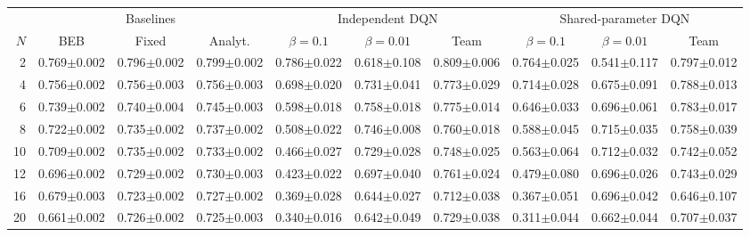 \begin{tabular}{@{}r|ccc|ccc|ccc@{}}
\toprule
 & \multicolumn{3}{c|}{Baselines} & \multicolumn{3}{c|}{Independent DQN} & \multicolumn{3}{c}{Shared-parameter DQN} \\
$N$ & BEB & Fixed & Analyt. & $\beta{=}0.1$ & $\beta{=}0.01$ & Team & $\beta{=}0.1$ & $\beta{=}0.01$ & Team \\
\midrule
2 & 0.769$\pm$0.002 & 0.796$\pm$0.002 & 0.799$\pm$0.002 & 0.786$\pm$0.022 & 0.618$\pm$0.108 & 0.809$\pm$0.006 & 0.764$\pm$0.025 & 0.541$\pm$0.117 & 0.797$\pm$0.012 \\
4 & 0.756$\pm$0.002 & 0.756$\pm$0.003 & 0.756$\pm$0.003 & 0.698$\pm$0.020 & 0.731$\pm$0.041 & 0.773$\pm$0.029 & 0.714$\pm$0.028 & 0.675$\pm$0.091 & 0.788$\pm$0.013 \\
6 & 0.739$\pm$0.002 & 0.740$\pm$0.004 & 0.745$\pm$0.003 & 0.598$\pm$0.018 & 0.758$\pm$0.018 & 0.775$\pm$0.014 & 0.646$\pm$0.033 & 0.696$\pm$0.061 & 0.783$\pm$0.017 \\
8 & 0.722$\pm$0.002 & 0.735$\pm$0.002 & 0.737$\pm$0.002 & 0.508$\pm$0.022 & 0.746$\pm$0.008 & 0.760$\pm$0.018 & 0.588$\pm$0.045 & 0.715$\pm$0.035 & 0.758$\pm$0.039 \\
10 & 0.709$\pm$0.002 & 0.735$\pm$0.002 & 0.733$\pm$0.002 & 0.466$\pm$0.027 & 0.729$\pm$0.028 & 0.748$\pm$0.025 & 0.563$\pm$0.064 & 0.712$\pm$0.032 & 0.742$\pm$0.052 \\
12 & 0.696$\pm$0.002 & 0.729$\pm$0.002 & 0.730$\pm$0.003 & 0.423$\pm$0.022 & 0.697$\pm$0.040 & 0.761$\pm$0.024 & 0.479$\pm$0.080 & 0.696$\pm$0.026 & 0.743$\pm$0.029 \\
16 & 0.679$\pm$0.003 & 0.723$\pm$0.002 & 0.727$\pm$0.002 & 0.369$\pm$0.028 & 0.644$\pm$0.027 & 0.712$\pm$0.038 & 0.367$\pm$0.051 & 0.696$\pm$0.042 & 0.646$\pm$0.107 \\
20 & 0.661$\pm$0.002 & 0.726$\pm$0.002 & 0.725$\pm$0.003 & 0.340$\pm$0.016 & 0.642$\pm$0.049 & 0.729$\pm$0.038 & 0.311$\pm$0.044 & 0.662$\pm$0.044 & 0.707$\pm$0.037 \\
\bottomrule
\end{tabular}
